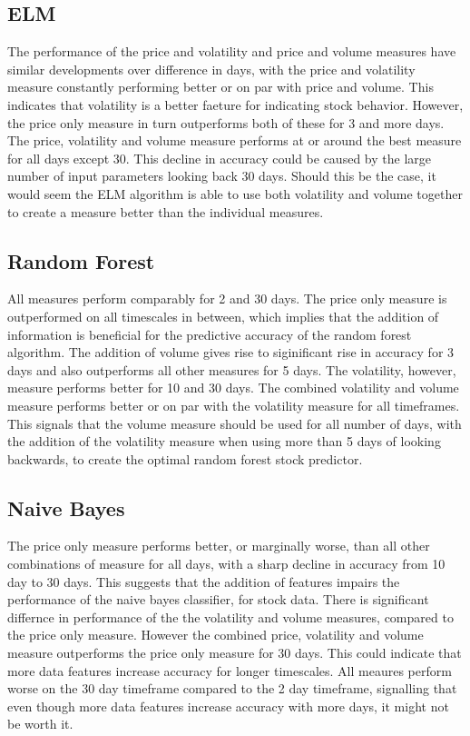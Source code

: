 \documentclass{article}
\begin{document}
\subsection{ELM}
The performance of the price and volatility and price and volume measures have similar developments over difference in days, with the price and volatility measure constantly performing better or on par with price and volume. This indicates that volatility is a better faeture for indicating stock behavior. However, the price only measure in turn outperforms both of these for 3 and more days. The price, volatility and volume measure performs at or around the best measure for all days except 30. This decline in accuracy could be caused by the large number of input parameters looking back 30 days. Should this be the case, it would seem the ELM algorithm is able to use both volatility and volume together to create a measure better than the individual measures. 

\subsection{Random Forest}
All measures perform comparably for 2 and 30 days. The price only measure is outperformed on all timescales in between, which implies that the addition of information is beneficial for the predictive accuracy of the random forest algorithm. The addition of volume gives rise to siginificant rise in accuracy for 3 days and also outperforms all other measures for 5 days. The volatility, however,  measure performs better for 10 and 30 days. The combined volatility and volume measure performs better or on par with the volatility measure for all timeframes. This signals that the volume measure should be used for all number of days, with the addition of the volatility measure when using more than 5 days of looking backwards, to create the optimal random forest stock predictor.

\subsection{Naive Bayes}
The price only measure performs better, or marginally worse, than all other combinations of measure for all days, with a sharp decline in accuracy from 10 day to 30 days. This suggests that the addition of features impairs the performance of the naive bayes classifier, for stock data. There is significant differnce in performance of the the volatility and volume measures, compared to the price only measure. However the combined price, volatility and volume measure outperforms the price only measure for 30 days. This could indicate that more data features increase accuracy for longer timescales. All meaures perform worse on the 30 day timeframe compared to the 2 day timeframe, signalling that even though more data features increase accuracy with more days, it might not be worth it. 
\end{document}
